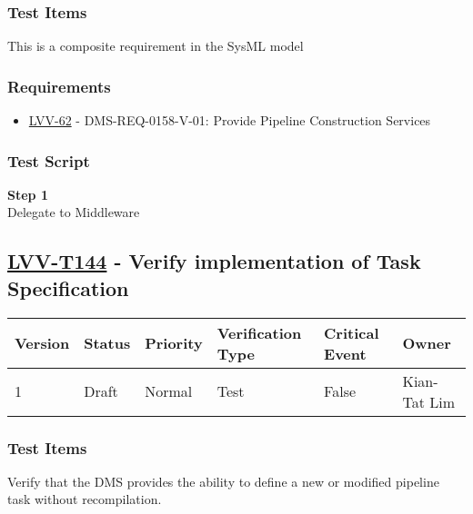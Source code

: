 \subsubsection{Test Items}\label{test-items-15}

This is a composite requirement in the SysML model

\subsubsection{Requirements}\label{requirements-15}

\begin{itemize}
\tightlist
\item
  \href{https://jira.lsstcorp.org/browse/LVV-62}{LVV-62} -
  DMS-REQ-0158-V-01: Provide Pipeline Construction Services
\end{itemize}

\subsubsection{Test Script}\label{test-script-15}

\textbf{Step 1}\\
Delegate to Middleware\\[2\baselineskip]

\hypertarget{lvv-t144---verify-implementation-of-task-specification}{\subsection{\texorpdfstring{\href{https://jira.lsstcorp.org/secure/Tests.jspa\#/testCase/LVV-T144}{LVV-T144}
- Verify implementation of Task
Specification}{LVV-T144 - Verify implementation of Task Specification}}\label{lvv-t144---verify-implementation-of-task-specification}}

\begin{longtable}[]{@{}llllll@{}}
\toprule
Version & Status & Priority & Verification Type & Critical Event &
Owner\tabularnewline
\midrule
\endhead
1 & Draft & Normal & Test & False & Kian-Tat Lim\tabularnewline
\bottomrule
\end{longtable}

\subsubsection{Test Items}\label{test-items-16}

Verify that the DMS provides the ability to define a new or modified
pipeline task without recompilation.

